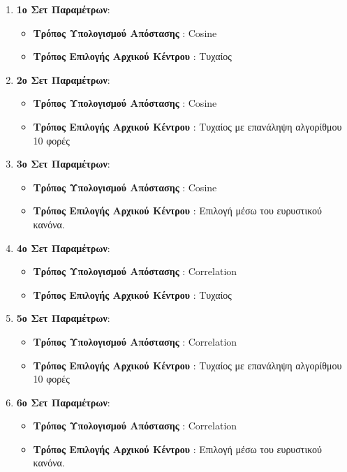 \begin{enumerate}
    \item \textbf{1ο Σετ Παραμέτρων}:
    \begin{itemize}
        \item \textbf{Τρόπος Υπολογισμού Απόστασης} : Cosine
        \item \textbf{Τρόπος Επιλογής Αρχικού Κέντρου} : Τυχαίος
    \end{itemize}
    \item  \textbf{2ο Σετ Παραμέτρων}:
    \begin{itemize}
        \item \textbf{Τρόπος Υπολογισμού Απόστασης} : Cosine
        \item \textbf{Τρόπος Επιλογής Αρχικού Κέντρου} : Τυχαίος με επανάληψη αλγορίθμου 10 φορές
    \end{itemize}
    \item  \textbf{3ο Σετ Παραμέτρων}:
        \begin{itemize}
            \item \textbf{Τρόπος Υπολογισμού Απόστασης} : Cosine
            \item \textbf{Τρόπος Επιλογής Αρχικού Κέντρου} : Επιλογή μέσω του ευρυστικού κανόνα.
        \end{itemize}
    \item  \textbf{4ο Σετ Παραμέτρων}:
        \begin{itemize}
            \item \textbf{Τρόπος Υπολογισμού Απόστασης} : Correlation
            \item \textbf{Τρόπος Επιλογής Αρχικού Κέντρου} : Τυχαίος
        \end{itemize}
    \item  \textbf{5ο Σετ Παραμέτρων}:
        \begin{itemize}
            \item \textbf{Τρόπος Υπολογισμού Απόστασης} : Correlation
            \item \textbf{Τρόπος Επιλογής Αρχικού Κέντρου} : Τυχαίος με επανάληψη αλγορίθμου 10 φορές
        \end{itemize}
    \item  \textbf{6ο Σετ Παραμέτρων}:
        \begin{itemize}
            \item \textbf{Τρόπος Υπολογισμού Απόστασης} : Correlation
            \item \textbf{Τρόπος Επιλογής Αρχικού Κέντρου} :  Επιλογή μέσω του ευρυστικού κανόνα.
        \end{itemize}
\end{enumerate}


